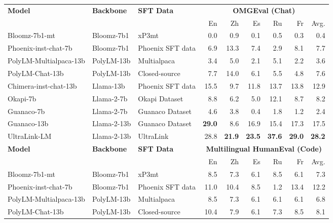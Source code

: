 \documentclass[11pt]{article}
\begin{document}
\begin{table*}[t]
  \setlength{\tabcolsep}{8pt}
  \centering
  \small
  \begin{tabular}{l l l rrrrrr }
    \toprule
    \multirow{2}{*}{\bf Model} &  \multirow{2}{*}{\bf Backbone} & \multirow{2}{*}{\bf SFT Data} & \multicolumn{6}{c}{{\bf OMGEval (Chat)}}  \\
    \cmidrule(lr){4-9}
    & & & En & Zh & Es & Ru & Fr & Avg. \\
    \midrule
     Bloomz-7b1-mt & Bloomz-7b1 & xP3mt & 0.0 & 0.9 & 0.1 & 0.5 & 0.3 & 0.4 \\
     Phoenix-inst-chat-7b & Bloomz-7b1 & Phoenix SFT data & 6.9 & 13.3 & 7.4 & 2.9 & 8.1 & 7.7 \\
     PolyLM-Multialpaca-13b & PolyLM-13b & Multialpaca & 3.4 & 5.0 & 2.1 & 5.1 & 2.2 & 3.6 \\
     PolyLM-Chat-13b & PolyLM-13b & Closed-source & 7.7 & 14.0 & 6.1 & 5.5 & 4.8 & 7.6 \\
     Chimera-inst-chat-13b & Llama-13b & Phoenix SFT data & 15.5 & 9.7 & 11.8 & 13.7 & 13.8 & 12.9 \\
     Okapi-7b &  Llama-2-7b &  Okapi Dataset & 8.8 & 6.2 & 5.0 & 12.1 & 8.7 & 8.2 \\
     Guanaco-7b & Llama-2-7b & Guanaco Dataset & 4.6 & 3.8 & 0.4 & 1.8 & 1.2 & 2.4 \\
     Guanaco-13b & Llama-2-13b & Guanaco Dataset & \bf 29.0 & 8.6 & 16.9 & 15.4 & 17.3 & 17.5 \\
     \cmidrule(lr){1-1} \cmidrule(lr){2-2} \cmidrule(lr){3-3} \cmidrule(lr){4-9}  
     UltraLink-LM & Llama-2-13b & UltraLink &  28.8 & \bf 21.9 & \bf 23.5 & \bf 37.6 & \bf 29.0 & \bf 28.2  \\
     \midrule
     \multirow{2}{*}{\bf Model} &  \multirow{2}{*}{\bf Backbone} & \multirow{2}{*}{\bf SFT Data} & \multicolumn{6}{c}{{\bf Multilingual HumanEval (Code)}}  \\
    \cmidrule(lr){4-9}
    & & & En & Zh & Es & Ru & Fr & Avg. \\
    \midrule
     Bloomz-7b1-mt & Bloomz-7b1 & xP3mt & 8.5 & 7.3 & 6.1 & 8.5 & 6.1 & 7.3 \\
     Phoenix-inst-chat-7b & Bloomz-7b1 & Phoenix SFT data & 11.0 & 10.4 & 8.5 & 1.2 & 13.4 & 12.2 \\
     PolyLM-Multialpaca-13b & PolyLM-13b & Multialpaca & 8.5 & 7.3 & 6.1 & 6.1 & 6.1 & 6.8 \\
     PolyLM-Chat-13b & PolyLM-13b & Closed-source & 10.4 & 7.9 & 6.1 & 7.3 & 8.5 & 8.1 \\

\end{tabular}
\end{table*}
\end{document}

